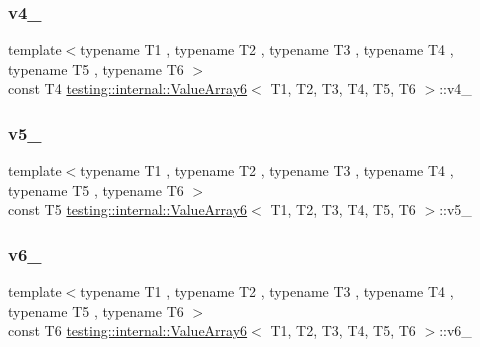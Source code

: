 \subsubsection{\texorpdfstring{v4\_}{v4\_}}
{\footnotesize\ttfamily template$<$typename T1 , typename T2 , typename T3 , typename T4 , typename T5 , typename T6 $>$ \\
const T4 \mbox{\hyperlink{classtesting_1_1internal_1_1_value_array6}{testing\+::internal\+::\+Value\+Array6}}$<$ T1, T2, T3, T4, T5, T6 $>$\+::v4\+\_\+\hspace{0.3cm}{\ttfamily [private]}}

\mbox{\label{classtesting_1_1internal_1_1_value_array6_a693e1ac4fe3942c4c58ebeff5d2dfb98}} 
\subsubsection{\texorpdfstring{v5\_}{v5\_}}
{\footnotesize\ttfamily template$<$typename T1 , typename T2 , typename T3 , typename T4 , typename T5 , typename T6 $>$ \\
const T5 \mbox{\hyperlink{classtesting_1_1internal_1_1_value_array6}{testing\+::internal\+::\+Value\+Array6}}$<$ T1, T2, T3, T4, T5, T6 $>$\+::v5\+\_\+\hspace{0.3cm}{\ttfamily [private]}}

\mbox{\label{classtesting_1_1internal_1_1_value_array6_a7dad64c4f26bd14b24b7d954edd52550}} 
\subsubsection{\texorpdfstring{v6\_}{v6\_}}
{\footnotesize\ttfamily template$<$typename T1 , typename T2 , typename T3 , typename T4 , typename T5 , typename T6 $>$ \\
const T6 \mbox{\hyperlink{classtesting_1_1internal_1_1_value_array6}{testing\+::internal\+::\+Value\+Array6}}$<$ T1, T2, T3, T4, T5, T6 $>$\+::v6\+\_\+\hspace{0.3cm}{\ttfamily [private]}}



